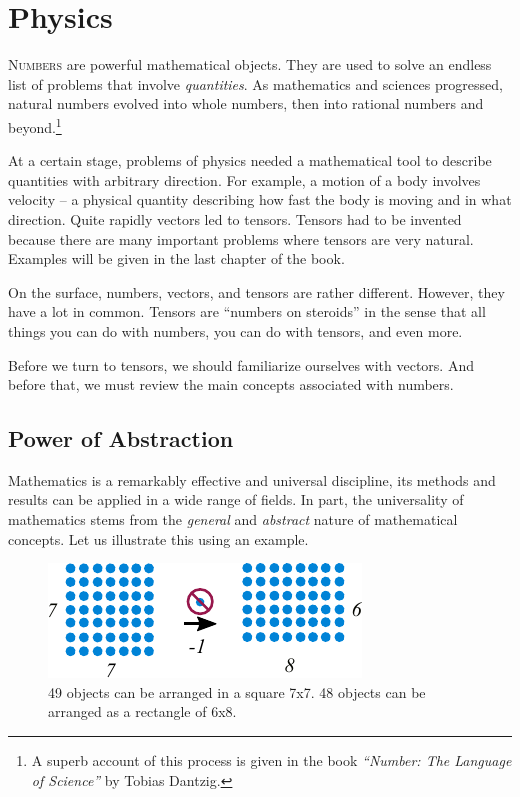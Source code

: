 \graphicspath{{../02Physics/pics/}}
	
\chapter[Physics]{Physics}\label{ch:Physics}

\lettrine[lines=2]{\color{darkocre}N}{umbers} are powerful
mathematical objects. They are used to solve
an endless list of problems that involve \emph{quantities}. As
mathematics
and sciences progressed, natural numbers evolved into whole
numbers, then into rational numbers and beyond.\footnote{A superb account of
this process is given in the book \emph{``Number: The Language of
Science''} by Tobias Dantzig.}

At a certain stage, problems of physics needed a mathematical
tool to describe quantities with arbitrary direction. For example, a
motion of a body involves velocity -- a physical quantity describing
how fast the body is moving and in what direction. Quite rapidly
vectors led to tensors. Tensors had to be invented because there are
many important problems where tensors are very natural. Examples will
be given in the last chapter of the book.

On the surface, numbers, vectors, and tensors
are rather different. However, they have a lot in common.
Tensors are ``numbers on steroids'' in the sense that all
 things you can do with numbers, you can do with tensors, and
even more.

Before we turn to tensors, we should familiarize ourselves with
vectors. And before that, we must review the main concepts associated
with numbers.

\section{Power of Abstraction}
Mathematics is a remarkably effective and universal discipline, its
methods and
results can be applied in a wide range of fields. In part, the universality of mathematics
stems from the \emph{general} and \emph{abstract} nature of mathematical
concepts. Let us illustrate this using an example.

\begin{figure}%
  \includegraphics[scale=1.0]{numbersExampleGenerality}
  \caption{49 objects can be arranged in a square 7x7. 48 objects can
    be arranged as a rectangle of 6x8.}
  \label{fig:numbersExampleGenerality}
\end{figure}

